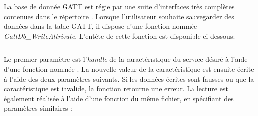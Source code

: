 \FloatBarrier
{}

La base de donnée GATT est régie par une suite d'interfaces très complètes contenues dans le répertoire . Lorsque l'utilisateur souhaite sauvegarder des données dans la table GATT, il dispose d'une fonction nommée \textit{GattDb\_WriteAttribute}. L'entête de cette fonction est disponible ci-dessous:

\begin{tcolorbox}
  [top=-1mm, bottom=-3mm, left=0mm, right=0mm, enhanced,breakable,
  attach boxed title to top center={yshift=-3mm,yshifttext=-1mm},colback=LightGray,colframe=DarkGray,
  colbacktitle=DarkGray, fonttitle=\footnotesize\bfseries,boxed title style={size=small,colframe=DarkGray},
  title=\texttt{gatt\_db\_app\_interface.h} ]
\inputminted[firstline=78,lastline=83,bgcolor=LightGray,fontsize=\footnotesize,breaklines,linenos]{C}{SourceCode/gatt_db_app_interface.h}
\end{tcolorbox}

Le premier paramètre est l'\textit{handle} de la caractéristique du service désiré à l'aide d'une fonction nommée . La nouvelle valeur de la caractéristique est ensuite écrite à l'aide des deux paramètres suivants. Si les données écrites sont fausses ou que la caractéristique est invalide, la fonction retourne une erreur. La lecture est également réalisée à l'aide d'une fonction du même fichier, en spécifiant des paramètres similaires : 
\begin{tcolorbox}
  [top=-1mm, bottom=-3mm, left=0mm, right=0mm, enhanced,breakable,
  attach boxed title to top center={yshift=-3mm,yshifttext=-1mm},colback=LightGray,colframe=DarkGray,
  colbacktitle=DarkGray, fonttitle=\footnotesize\bfseries,boxed title style={size=small,colframe=DarkGray},
  title=\texttt{gatt\_db\_app\_interface.h} ]
\inputminted[firstline=99,lastline=105,bgcolor=LightGray,fontsize=\footnotesize,breaklines,linenos]{C}{SourceCode/gatt_db_app_interface.h}
\end{tcolorbox}

\FloatBarrier
{}

